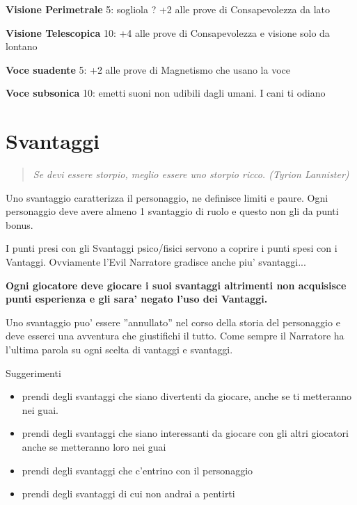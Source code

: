 \documentclass[a4paper,11pt,twoside,openany]{book}
\begin{document}
{\textbf{Visione Perimetrale} 5: sogliola ? +2 alle prove di Consapevolezza da lato

\textbf{Visione Telescopica} 10: +4 alle prove di Consapevolezza e visione solo da lontano

\textbf{Voce suadente} 5: +2 alle prove di Magnetismo che usano la voce

\textbf{Voce subsonica} 10: emetti suoni non udibili dagli umani. I cani ti odiano

\pagebreak

\section{Svantaggi}

\label{svantaggi}
\begin{quote}\textit{
Se devi essere storpio, meglio essere uno storpio ricco. (Tyrion Lannister)}\end{quote}

Uno svantaggio caratterizza il personaggio, ne definisce limiti e paure. Ogni personaggio deve avere almeno 1 svantaggio di ruolo e questo non gli da punti bonus.

I punti presi con gli Svantaggi psico/fisici servono a coprire i punti spesi con i Vantaggi. Ovviamente l'Evil Narratore gradisce anche piu' svantaggi...

\textbf{Ogni giocatore deve giocare i suoi svantaggi altrimenti non acquisisce punti esperienza e gli sara' negato l'uso dei Vantaggi.}

Uno svantaggio puo' essere ''annullato'' nel corso della storia del personaggio e deve esserci una avventura che giustifichi il tutto. Come sempre il Narratore ha l'ultima parola su ogni scelta di vantaggi e svantaggi.

\bigskip

Suggerimenti
\begin{itemize}
\item 
prendi degli svantaggi che siano divertenti da giocare, anche se ti metteranno nei guai. 
\item 
prendi degli svantaggi che siano interessanti da giocare con gli altri giocatori anche se metteranno loro nei guai 
\item 
prendi degli svantaggi che c'entrino con il personaggio 
\item 
prendi degli svantaggi di cui non andrai a pentirti 
\end{itemize}

}
\end{document}

